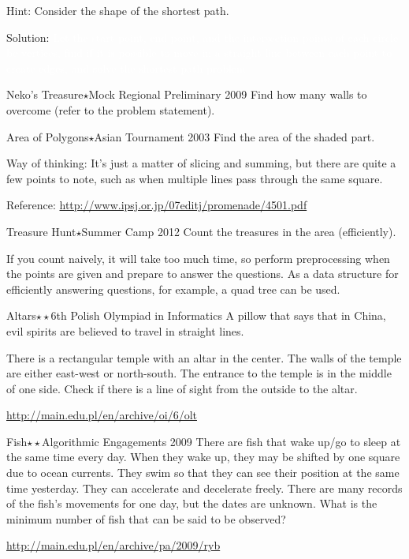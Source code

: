 Hint: Consider the shape of the shortest path.
 
Solution: \textcolor{white}{Let the start point, end point, and the intersection points of each circle be vertices, find if it is possible to move in a straight line between each point to create edges, and solve the shortest path problem.}

\begin{pbox}{Neko's Treasure$\star$}{Mock Regional Preliminary 2009}
Find how many walls to overcome (refer to the problem statement).

\end{pbox}

\begin{pbox}{Area of Polygons$\star$}{Asian Tournament 2003}
Find the area of the shaded part.

\end{pbox}
Way of thinking: It's just a matter of slicing and summing, but there are quite a few points to note, such as when multiple lines pass through the same square.

Reference: \url{http://www.ipsj.or.jp/07editj/promenade/4501.pdf}

\begin{pbox}{Treasure Hunt$\star$}{Summer Camp 2012}
Count the treasures in the area (efficiently).

\end{pbox}

If you count naively, it will take too much time, so perform preprocessing when the points are given and prepare to answer the questions.
As a data structure for efficiently answering questions, for example, a quad tree can be used.



\begin{pbox}{Altars$\star\star$}{6th Polish Olympiad in Informatics}
A pillow that says that in China, evil spirits are believed to travel in straight lines.

There is a rectangular temple with an altar in the center. The walls of the temple are either east-west or north-south. The entrance to the temple is in the middle of one side. Check if there is a line of sight from the outside to the altar.

\url{http://main.edu.pl/en/archive/oi/6/olt}  
\end{pbox}

\begin{pbox}{Fish$\star\star$}{Algorithmic Engagements 2009}
There are fish that wake up/go to sleep at the same time every day. When they wake up, they may be shifted by one square due to ocean currents. They swim so that they can see their position at the same time yesterday. They can accelerate and decelerate freely. There are many records of the fish's movements for one day, but the dates are unknown. What is the minimum number of fish that can be said to be observed?

\url{http://main.edu.pl/en/archive/pa/2009/ryb}  
\end{pbox}
